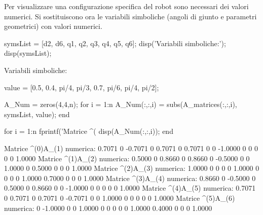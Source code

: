 \documentclass[11pt, a4paper]{article}
\begin{document}
\begin{par}
\begin{flushleft}
Per visualizzare una configurazione specifica del robot sono necessari dei valori numerici. Si sostituiscono ora le variabili simboliche (angoli di giunto e parametri geometrici) con valori numerici.
\end{flushleft}
\end{par}
\newpage
\begin{matlabcode}
symsList = [d2, d6, q1, q2, q3, q4, q5, q6];
disp('Variabili simboliche:');
disp(symsList);
\end{matlabcode}
\begin{matlaboutput}
Variabili simboliche:
\end{matlaboutput}
\begin{matlabcode}
value = [0.5, 0.4, pi/4, pi/3, 0.7, pi/6, pi/4, pi/2];

A_Num = zeros(4,4,n);
for i = 1:n
    A_Num(:,:,i) = subs(A_matrices(:,:,i), symsList, value);
end

for i = 1:n
    fprintf('Matrice ^(%
    disp(A_Num(:,:,i));
end
\end{matlabcode}
\begin{matlaboutput}
Matrice ^(0)A_(1) numerica:
    0.7071         0   -0.7071         0
    0.7071         0    0.7071         0
         0   -1.0000         0         0
         0         0         0    1.0000
Matrice ^(1)A_(2) numerica:
    0.5000         0    0.8660         0
    0.8660         0   -0.5000         0
         0    1.0000         0    0.5000
         0         0         0    1.0000
Matrice ^(2)A_(3) numerica:
    1.0000         0         0         0
         0    1.0000         0         0
         0         0    1.0000    0.7000
         0         0         0    1.0000
Matrice ^(3)A_(4) numerica:
    0.8660         0   -0.5000         0
    0.5000         0    0.8660         0
         0   -1.0000         0         0
         0         0         0    1.0000
Matrice ^(4)A_(5) numerica:
    0.7071         0    0.7071         0
    0.7071         0   -0.7071         0
         0    1.0000         0         0
         0         0         0    1.0000
Matrice ^(5)A_(6) numerica:
         0   -1.0000         0         0
    1.0000         0         0         0
         0         0    1.0000    0.4000
         0         0         0    1.0000
\end{matlaboutput}
\end{document}
